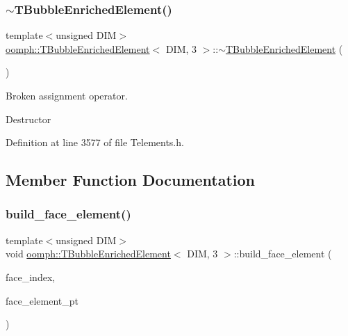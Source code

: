 \subsubsection{\texorpdfstring{$\sim$\+T\+Bubble\+Enriched\+Element()}{~TBubbleEnrichedElement()}}
{\footnotesize\ttfamily template$<$unsigned D\+IM$>$ \\
\hyperlink{classoomph_1_1TBubbleEnrichedElement}{oomph\+::\+T\+Bubble\+Enriched\+Element}$<$ D\+IM, 3 $>$\+::$\sim$\hyperlink{classoomph_1_1TBubbleEnrichedElement}{T\+Bubble\+Enriched\+Element} (\begin{DoxyParamCaption}{ }\end{DoxyParamCaption})\hspace{0.3cm}{\ttfamily [inline]}}



Broken assignment operator. 

Destructor 

Definition at line 3577 of file Telements.\+h.



\subsection{Member Function Documentation}
\mbox{\label{classoomph_1_1TBubbleEnrichedElement_3_01DIM_00_013_01_4_a3297077e3bd4514380233784ce6d4a19}} 
\subsubsection{\texorpdfstring{build\+\_\+face\+\_\+element()}{build\_face\_element()}}
{\footnotesize\ttfamily template$<$unsigned D\+IM$>$ \\
void \hyperlink{classoomph_1_1TBubbleEnrichedElement}{oomph\+::\+T\+Bubble\+Enriched\+Element}$<$ D\+IM, 3 $>$\+::build\+\_\+face\+\_\+element (\begin{DoxyParamCaption}\item[{const int \&}]{face\+\_\+index,  }\item[{\hyperlink{classoomph_1_1FaceElement}{Face\+Element} $\ast$}]{face\+\_\+element\+\_\+pt }\end{DoxyParamCaption})}




